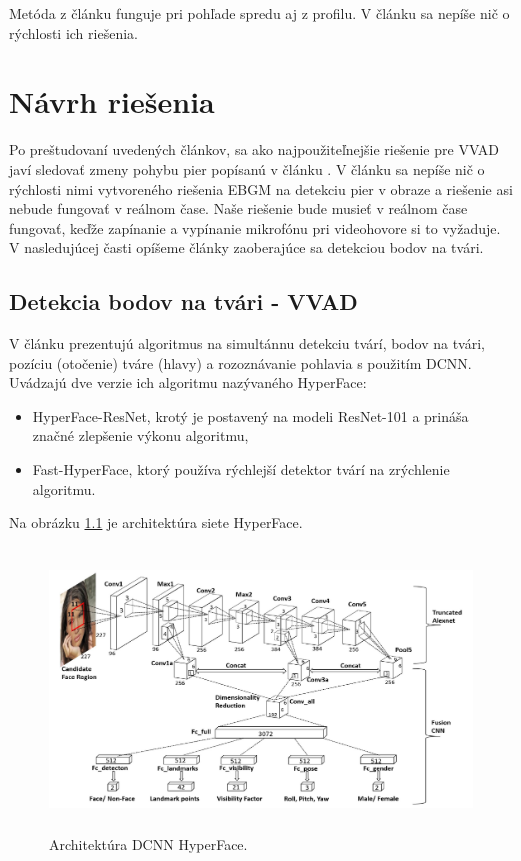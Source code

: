 Metóda z článku \cite{joosten2015voice} funguje pri pohľade spredu aj z profilu.
V článku sa nepíše nič o rýchlosti ich riešenia.\\

\chapter{Návrh riešenia}
Po preštudovaní uvedených článkov, sa ako najpoužiteľnejšie riešenie pre VVAD javí sledovať zmeny pohybu pier popísanú v článku \cite{aoki2007voice}. 
V článku sa nepíše nič o rýchlosti nimi vytvoreného riešenia EBGM na detekciu pier v obraze a riešenie asi nebude fungovať v reálnom čase. 
Naše riešenie bude musieť v reálnom čase fungovať, keďže zapínanie a vypínanie mikrofónu pri videohovore si to vyžaduje. 
V nasledujúcej časti opíšeme články zaoberajúce sa detekciou bodov na tvári.\\

\section{Detekcia bodov na tvári - VVAD}

V článku \cite{ranjan2017hyperface} prezentujú algoritmus na simultánnu detekciu tvárí, bodov na tvári, pozíciu (otočenie) tváre (hlavy) a rozoznávanie pohlavia s použitím DCNN. 
Uvádzajú dve verzie ich algoritmu nazývaného HyperFace:
 \begin{itemize}
\item HyperFace-ResNet, krotý je postavený na modeli ResNet-101 a prináša značné zlepšenie výkonu algoritmu,
\item Fast-HyperFace, ktorý používa rýchlejší detektor tvárí na zrýchlenie algoritmu.
\end{itemize}
Na obrázku \ref{pic-ranjan2017hyperface-siet} je architektúra siete HyperFace. 

\begin{figure}[H]
	\begin{center}
		\includegraphics[height=7.5cm]{pics/pic-ranjan2017hyperface-siet.png}
		\caption{Architektúra DCNN HyperFace. 
		 \cite{ranjan2017hyperface}}
		\label{pic-ranjan2017hyperface-siet}
	\end{center}
\end{figure}

